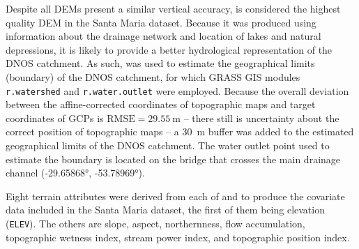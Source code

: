 

Despite all DEMs present a similar vertical accuracy, \demNew{} is considered the highest quality DEM in the 
Santa Maria dataset. Because it was produced using information about the drainage network and location of 
lakes and natural depressions, it is likely to provide a better hydrological representation of the DNOS 
catchment. As such, \demNew{} was used to estimate the geographical limits (boundary) of the DNOS catchment, 
for which GRASS GIS modules \texttt{r.watershed} and \texttt{r.water.outlet} were employed. Because the 
overall deviation between the affine-corrected coordinates of topographic maps and target coordinates of GCPs 
is $\text{RMSE} = \SI{29.55}{\m}$ -- there still is uncertainty about the correct position of topographic maps 
-- a \SI{30}{\m} buffer was added to the estimated geographical limits of the DNOS catchment. The water outlet 
point used to estimate the boundary is located on the bridge that crosses the main drainage channel 
(\ang{-29.65868}, \ang{-53.78969}).

Eight terrain attributes were derived from each of \demOld{} and \demNew{} to produce the covariate data 
included in the Santa Maria dataset, the first of them being elevation (\texttt{ELEV}). The others are slope, 
aspect, northernness, flow accumulation, topographic wetness index, stream power index, and topographic 
position index.

